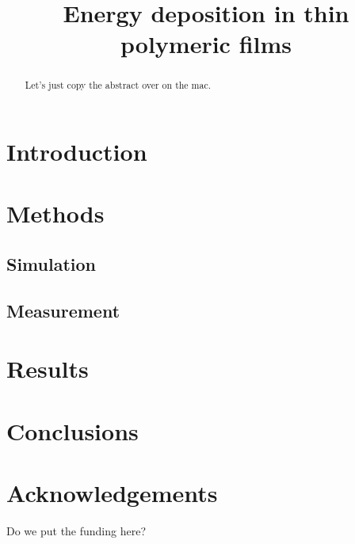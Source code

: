 \documentclass[draftcls,onecolumn]{IEEEtran}
\begin{document}
\title{Energy deposition in thin polymeric films}

\author{
}

\maketitle

\begin{abstract}
Let's just copy the abstract over on the mac.
\end{abstract}

\IEEEpeerreviewmaketitle

\section{Introduction}
\label{sec:Intro}

\section{Methods}
\label{sec:Methods}
\subsection{Simulation}
\subsection{Measurement}

\section{Results}
\label{sec:Results}

\section{Conclusions}
\label{sec:Conclusions}

\section{Acknowledgements}
Do we put the funding here?


\end{document}
